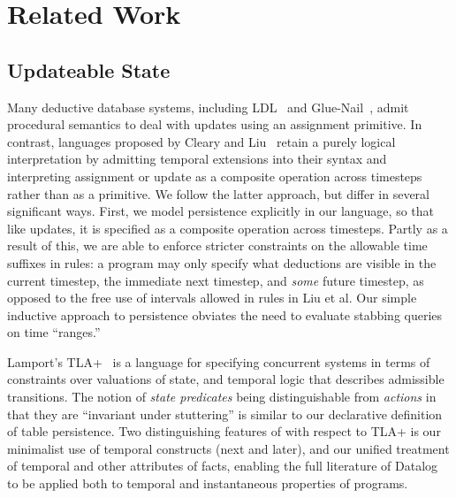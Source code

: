 \section{Related Work}

\subsection{Updateable State}

Many deductive database systems, including LDL~\cite{ldl} and Glue-Nail~\cite{glue-nail}, admit procedural semantics to deal with updates using an
assignment primitive.  In contrast, languages proposed by Cleary and Liu~\cite{harmful,deductiveupdates,starlog} retain a purely logical 
interpretation by admitting temporal extensions into their syntax and interpreting assignment or update as a composite operation
across timesteps~\cite{deductiveupdates} rather than as a primitive.  We follow the latter approach, but differ in several significant ways.
First, we model persistence explicitly in our language, so that like updates, it is specified as a composite operation across timesteps.
Partly as a result of this, we are able to enforce stricter constraints on the allowable time suffixes in rules: a program may only specify what deductions are visible
in the current timestep, the immediate next timestep, and \emph{some} future timestep, as opposed to the free use of intervals allowed in rules in Liu et al.  Our simple inductive approach to persistence obviates the need to evaluate stabbing queries on time ``ranges.''

Lamport's TLA+~\cite{tla} is a language for specifying 
concurrent systems in terms of constraints over valuations of state, and temporal logic that describes admissible transitions.  The notion of 
\emph{state predicates} being distinguishable from \emph{actions} in that they are ``invariant under stuttering'' is similar to our declarative definition 
of table persistence.  Two distinguishing features of \lang with respect to TLA+ is our minimalist use of temporal constructs (next and later), and our unified treatment of temporal and other attributes of facts, enabling the full literature of Datalog to be applied both to temporal and instantaneous properties of programs.


